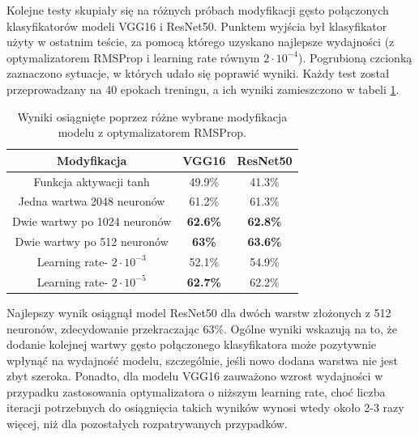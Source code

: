 Kolejne testy skupiały się na różnych próbach modyfikacji gęsto połączonych klasyfikatorów modeli VGG16 i ResNet50. Punktem wyjścia był klasyfikator użyty w ostatnim teście, za pomocą którego uzyskano najlepsze wydajności (z optymalizatorem RMSProp i learning rate równym $2\cdot10^{-4}$). Pogrubioną czcionką zaznaczono sytuacje, w których udało się poprawić wyniki. Każdy test został przeprowadzany na 40 epokach treningu, a ich wyniki zamieszczono w tabeli \ref{tab:5.14}.

\begin{table}[H]
  \centering
  \caption{Wyniki osiągnięte poprzez różne wybrane modyfikacja modelu z optymalizatorem RMSProp.}
    \begin{tabular}{ |c|c|c| }
    \hline
    Modyfikacja & VGG16 & ResNet50 \\
    \hline
    Funkcja aktywacji tanh & 49.9\% & 41.3\% \\ 
    Jedna wartwa 2048 neuronów & 61.2\% & 61.3\% \\ 
    Dwie wartwy po 1024 neuronów & \textbf{62.6\%} & \textbf{62.8\%} \\ 
    Dwie wartwy po 512 neuronów & \textbf{63\%} & \textbf{63.6\%} \\
    Learning rate- $2\cdot10^{-3}$ & 52.1\% & 54.9\% \\
    Learning rate- $2\cdot10^{-5}$ & \textbf{62.7\%} & 62.2\% \\
    \hline
    \end{tabular}
  \label{tab:5.14}
\end{table}

Najlepszy wynik osiągnął model ResNet50 dla dwóch warstw złożonych z 512 neuronów, zdecydowanie przekraczając 63\%. Ogólne wyniki wskazują na to, że dodanie kolejnej wartwy gęsto połączonego klasyfikatora może pozytywnie wpłynąć na wydajność modelu, szczególnie, jeśli nowo dodana warstwa nie jest zbyt szeroka. Ponadto, dla modelu VGG16 zauważono wzrost wydajności w przypadku zastosowania optymalizatora o niższym learning rate, choć liczba iteracji potrzebnych do osiągnięcia takich wyników wynosi wtedy około 2-3 razy więcej, niż dla pozostałych rozpatrywanych przypadków.

